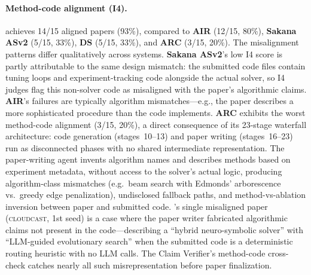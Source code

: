 \paragraph{Method-code alignment (I4).}
\textbf{\sys{}} achieves 14/15 aligned papers (93\%), compared to \textbf{AIR} (12/15, 80\%), \textbf{Sakana ASv2} (5/15, 33\%), \textbf{DS} (5/15, 33\%), and \textbf{ARC} (3/15, 20\%).
The misalignment patterns differ qualitatively across systems.
\textbf{Sakana ASv2}'s low I4 score is partly attributable to the same design mismatch: the submitted code files contain tuning loops and experiment-tracking code alongside the actual solver, so I4 judges flag this non-solver code as misaligned with the paper's algorithmic claims.
\textbf{AIR}'s failures are typically algorithm mismatches---e.g., the paper describes a more sophisticated procedure than the code implements.
\textbf{ARC} exhibits the worst method-code alignment (3/15, 20\%), a direct consequence of its 23-stage waterfall architecture: code generation (stages~10--13) and paper writing (stages~16--23) run as disconnected phases with no shared intermediate representation.
The paper-writing agent invents algorithm names and describes methods based on experiment metadata, without access to the solver's actual logic, producing algorithm-class mismatches (e.g.\ beam search with Edmonds' arborescence vs.\ greedy edge penalization), undisclosed fallback paths, and method-vs-ablation inversion between paper and submitted code.
\textbf{\sys{}}'s single misaligned paper (\textsc{cloudcast}, 1st seed) is a case where the paper writer fabricated algorithmic claims not present in the code---describing a ``hybrid neuro-symbolic solver'' with ``LLM-guided evolutionary search'' when the submitted code is a deterministic routing heuristic with no LLM calls.
The Claim Verifier's method-code cross-check catches nearly all such misrepresentation before paper finalization.


